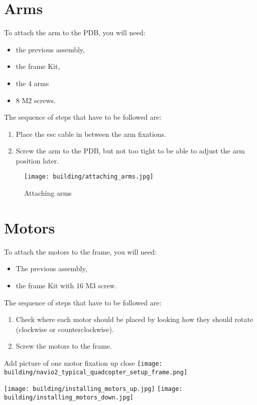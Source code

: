 \section{Arms}
To attach the arm to the PDB, you will need:
\begin{itemize}
    \item the previous assembly,
    \item the frame Kit,
    \item the 4 arms
    \item 8 M2 screws.
\end{itemize}
The sequence of steps that have to be followed are:
\begin{enumerate}
    \item Place the esc cable in between the arm fixations.
    \item Screw the arm to the PDB, but not too tight to be able to adjust the arm position later.
\end{enumerate}

\begin{figure}[!ht]
    \centering
    \texttt{[image: building/attaching\_arms.jpg]}
    \caption{Attaching arms}
    \label{fig:arms}
\end{figure}




\section{Motors}
To attach the motors to the frame, you will need:
\begin{itemize}
    \item The previous assembly,
    \item the frame Kit with 16 M3 screw.
\end{itemize}
The sequence of steps that have to be followed are:
\begin{enumerate}
    \item Check where each motor should be placed by looking how they should rotate (clockwise or counterclockwise).
    \item Screw the motors to the frame.
\end{enumerate}

{\color{blue} Add picture of one motor fixation up close}
\texttt{[image: building/navio2\_typical\_quadcopter\_setup\_frame.png]}

\texttt{[image: building/installing\_motors\_up.jpg]}
\texttt{[image: building/installing\_motors\_down.jpg]}

